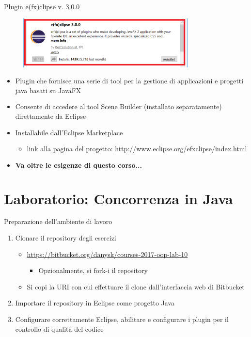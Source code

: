 \documentclass[presentation]{beamer}
\begin{document}
\begin{frame}{Plugin e(fx)clipse v. 3.0.0}
\begin{figure}
\includegraphics[width=0.8\textwidth]{img/plugin-install.png}
\end{figure}
\begin{itemize}\itemsep5pt
\item Plugin che fornisce una serie di tool per la gestione di applicazioni e progetti java basati su JavaFX
\item Consente di accedere al tool Scene Builder (installato separatamente) direttamente da Eclipse
\item Installabile dall'Eclipse Marketplace
\begin{itemize}
\item link alla pagina del progetto: \url{http://www.eclipse.org/efxclipse/index.html}
\end{itemize}
\item \textbf{Va oltre le esigenze di questo corso...}
\end{itemize}
\end{frame}

\section{Laboratorio: Concorrenza in Java}

\begin{frame}{Preparazione dell'ambiente di lavoro}
	\begin{enumerate}\itemsep20pt
		\item Clonare il repository degli esercizi
		\begin{itemize}
			\item \url{https://bitbucket.org/danysk/courses-2017-oop-lab-10}
		\begin{itemize}
		\item Opzionalmente, si fork-i il repository
		\end{itemize}
			\item Si copi la URI con cui effettuare il clone dall'interfaccia web di Bitbucket
		\end{itemize}
		\item Importare il repository in Eclipse come progetto Java
		\item Configurare correttamente Eclipse, abilitare e configurare i plugin per il controllo di qualità del codice
	\end{enumerate}
\end{frame}
\end{document}
